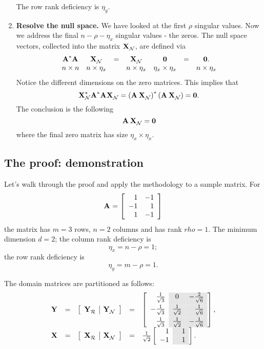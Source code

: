 \begin{enumerate}
\subitem The row rank deficiency is $\eta_{y}$.
\item \textbf{Resolve the null space.} We have looked at the first $\rho$ singular values. Now we address the final $n-\rho-\eta_{x}$ singular values - the zeros. The null space vectors, collected into the matrix $\textbf{X}^{\mathrm{}}_{\mathcal{N}}$, are defined via
\begin{equation}
\begin{array}{ccccccc}
  \textbf{A}^{\mathrm{ \mathrm{*} }}\textbf{A}^{\mathrm{}} & \textbf{X}^{\mathrm{}}_{\mathcal{N}} &=& \textbf{X}^{\mathrm{}}_{\mathcal{N}}&\textbf{0} &=& \textbf{0}.\\
  n \times n  & n \times \eta_{x}    && n \times \eta_{x} & \eta_{x} \times \eta_{x} && n \times \eta_{x}
\end{array}
\end{equation}
\subitem Notice the different dimensions on the zero matrices.
This implies that
\begin{equation}
  \textbf{X}^{\mathrm{*}}_{\mathcal{N}}\textbf{A}^{\mathrm{ \mathrm{*} }}\textbf{A}^{\mathrm{}}\textbf{X}^{\mathrm{}}_{\mathcal{N}} = \left( \textbf{A}^{\mathrm{}}\,\textbf{X}^{\mathrm{}}_{\mathcal{N}} \right)^{*}\left( \textbf{A}^{\mathrm{}}\,\textbf{X}^{\mathrm{}}_{\mathcal{N}} \right) = \textbf{0}.
\end{equation}
The conclusion is the following
\begin{equation}
  \textbf{A}^{\mathrm{}}\,\textbf{X}^{\mathrm{}}_{\mathcal{N}} = \textbf{0}
\end{equation}
where the final zero matrix has size $\eta_{x}\times \eta_{x}$.
\end{enumerate}

\subsection{The proof: demonstration}
Let's walk through the proof and apply the methodology to a sample matrix. For 
\begin{equation}
  \textbf{A}^{\mathrm{}} = \left[\begin{array}{ rr } 1 & -1 \\ -1 & 1 \\ 1 & -1 \end{array}\right]
\end{equation}
the matrix has $m=3$ rows, $n=2$ columns and has rank $rho=1$. The minimum dimension $d=2$; the column rank deficiency is
\begin{equation}
  \eta_{x} = n - \rho = 1;
\end{equation}
the row rank deficiency is
\begin{equation}
  \eta_{y} = m - \rho = 1.
\end{equation}

The domain matrices are partitioned as follows:
\begin{equation}
  \begin{array}{lcccl}
    \Y{} &=& \mat{c|c}{\yrng&\ynll} &=& \Yshade, \\
    \X{} &=& \mat{c|c}{\xrng&\xnll} &=& \Xshade.
  \end{array}
\end{equation}

